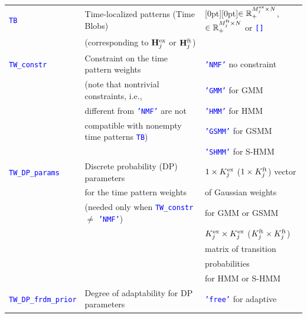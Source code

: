 \documentclass{article}
\newcommand{\matlabcolor}{blue}
\newcommand{\matvar}[1]{\textcolor{\matlabcolor}{\tt {#1}}}
\begin{document}
\begin{table}[t]
\begin{center}
\begin{tabular}{l|l|l}
      \hhline{---}
       \matvar{TB} & Time-localized patterns (Time Blobs) & \raisebox{-5.5pt}[0pt][0pt]{$\in \mathbb R_+^{M^{\rm ex}_j \times N}$, $\in \mathbb R_+^{M^{\rm ft}_j \times N}$ or \matvar{[]}} \\
                   & (corresponding to ${\bf H}^{\rm ex}_j$ or ${\bf H}^{\rm ft}_j$) &  \\
      \hhline{---}
       \matvar{TW\_constr} & Constraint on the time pattern weights & \matvar{'NMF'} no constraint \\
      \hhline{~~-}
                       & (note that nontrivial constraints, i.e.,   & \matvar{'GMM'} for GMM \\
      \hhline{~~-}
                       & different from \matvar{'NMF'} are not      & \matvar{'HMM'} for HMM \\
      \hhline{~~-}
                       & compatible with nonempty time patterns \matvar{TB})  & \matvar{'GSMM'} for GSMM \\
      \hhline{~~-}
                       &                                      & \matvar{'SHMM'} for S-HMM \\
      \hhline{---}
       \matvar{TW\_DP\_params} & Discrete probability (DP) parameters & $1 \times K^{\rm ex}_j$ ($1 \times K^{\rm ft}_j$) vector \\
                               & for the time pattern weights                              & of Gaussian weights                             \\
                               & (needed only when \matvar{TW\_constr} $\ne$ \matvar{'NMF'})  & for GMM or GSMM                              \\
      \hhline{~~-}
                       &                                                           & $K^{\rm ex}_j \times K^{\rm ex}_j$ ($K^{\rm ft}_j \times K^{\rm ft}_j$) \\
                       &                                                           & matrix of transition\\
                               &                                                   &  probabilities                    \\
                               &                                                   & for HMM or S-HMM                              \\
      \hhline{---}
       \matvar{TW\_DP\_frdm\_prior} & Degree of adaptability for DP parameters & \matvar{'free'} for adaptive \\

\end{tabular}
\end{center}
\end{table}
\end{document}
